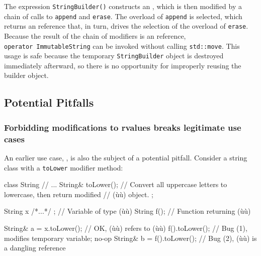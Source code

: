 The expression \lstinline!StringBuilder()! constructs an ,
which is then modified by a chain of calls to \lstinline!append! and
\lstinline!erase!. The  overload of \lstinline!append! is
selected, which returns an  reference that, in turn, drives
the selection of the  overload of \lstinline!erase!. Because
the result of the chain of modifiers is an  reference,
\lstinline!operator!~\lstinline!ImmutableString! can be invoked without
calling \lstinline!std::move!. This usage is safe because the temporary
\lstinline!StringBuilder! object is destroyed immediately afterward, so
there is no opportunity for improperly reusing the builder object.

\subsection[Potential Pitfalls]{Potential Pitfalls}\label{potential-pitfalls-refqualifer}

\subsubsection[Forbidding modifications to \romeovalue{rvalues} breaks legitimate use cases]{Forbidding modifications to {\sfbsubsubsecitalRomeo rvalues} breaks legitimate use cases}\label{forbidding-modifications-to-rvalues-breaks-legitimate-use-cases}

An earlier use case, , is
also the subject of a potential pitfall. Consider a string class with a
\lstinline!toLower! modifier method:

\begin{emcppslisting}
class String
{
    // ...
    String& toLower();
        // Convert all uppercase letters to lowercase, then return modified
        // (ù{}ù) object.
};

String x{ /*...*/ };  // Variable of type (ù{}ù)
String f();           // Function returning (ù{}ù)

String& a = x.toLower();    // OK, (ù{}ù) refers to (ù{}ù)
f().toLower();              // Bug (1), modifies temporary variable; no-op
String& b = f().toLower();  // Bug (2), (ù{}ù) is a dangling reference
\end{emcppslisting}
    

